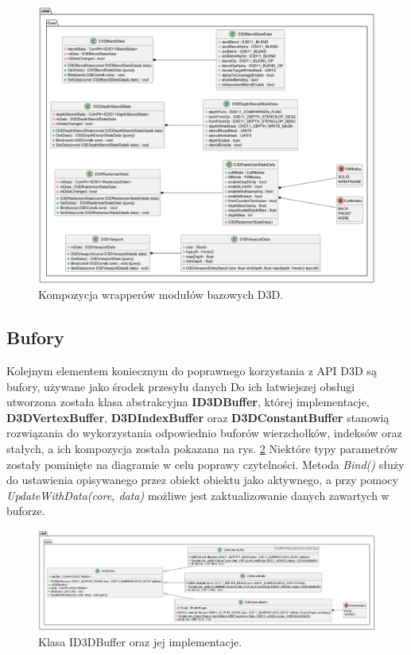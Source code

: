 	\begin{figure}[h!]
		\centering
		\includegraphics[width=\textwidth]{images/UML/d3dutils.png}
		\caption{Kompozycja wrapperów modułów bazowych D3D.}
		\label{UML_D3DUtils}
	\end{figure}
	
	\vfill
	\clearpage
	
\subsection{Bufory}
	Kolejnym elementem koniecznym do poprawnego korzystania z API D3D są bufory, używane jako środek przesyłu danych 
	Do ich łatwiejszej obsługi utworzona została klasa abstrakcyjna \textbf{ID3DBuffer}, której implementacje, \textbf{D3DVertexBuffer}, \textbf{D3DIndexBuffer} oraz \textbf{D3DConstantBuffer} stanowią rozwiązania do wykorzystania odpowiednio buforów wierzchołków, indeksów oraz stałych, a ich kompozycja została pokazana na rys. \ref{UML_Buffer}
	Niektóre typy parametrów zostały pominięte na diagramie w celu poprawy czytelności.
	Metoda \textit{Bind()} służy do ustawienia opisywanego przez obiekt obiektu jako aktywnego, a przy pomocy \textit{UpdateWithData(core, data)} możliwe jest zaktualizowanie danych zawartych w buforze.
		
	\begin{figure}[h!]
		\centering
		\includegraphics[width=\textwidth]{images/UML/buffer.png}
		\caption{Klasa ID3DBuffer oraz jej implementacje.}
		\label{UML_Buffer}
	\end{figure}
	
